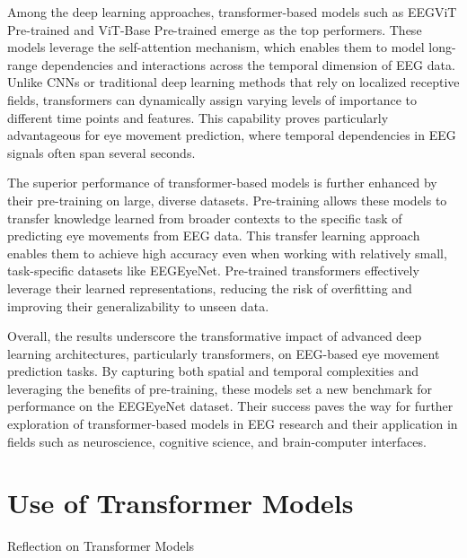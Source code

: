 \documentclass{article}
\begin{document}
Among the deep learning approaches, transformer-based models such as EEGViT Pre-trained and ViT-Base Pre-trained emerge as the top performers. These models leverage the self-attention mechanism, which enables them to model long-range dependencies and interactions across the temporal dimension of EEG data. Unlike CNNs or traditional deep learning methods that rely on localized receptive fields, transformers can dynamically assign varying levels of importance to different time points and features. This capability proves particularly advantageous for eye movement prediction, where temporal dependencies in EEG signals often span several seconds.

The superior performance of transformer-based models is further enhanced by their pre-training on large, diverse datasets. Pre-training allows these models to transfer knowledge learned from broader contexts to the specific task of predicting eye movements from EEG data. This transfer learning approach enables them to achieve high accuracy even when working with relatively small, task-specific datasets like EEGEyeNet. Pre-trained transformers effectively leverage their learned representations, reducing the risk of overfitting and improving their generalizability to unseen data.

Overall, the results underscore the transformative impact of advanced deep learning architectures, particularly transformers, on EEG-based eye movement prediction tasks. By capturing both spatial and temporal complexities and leveraging the benefits of pre-training, these models set a new benchmark for performance on the EEGEyeNet dataset. Their success paves the way for further exploration of transformer-based models in EEG research and their application in fields such as neuroscience, cognitive science, and brain-computer interfaces.

\section {Use of Transformer Models}

Reflection on Transformer Models
\end{document}
